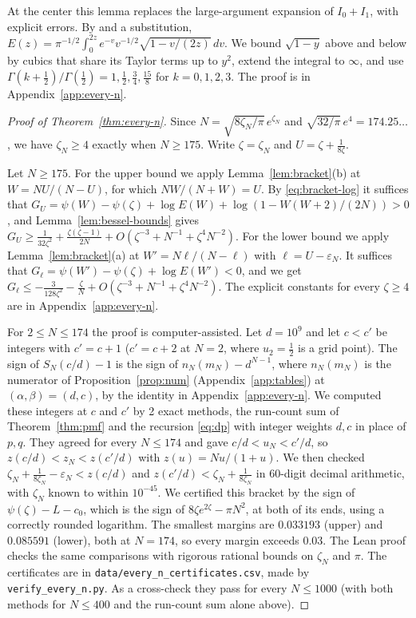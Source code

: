 At the center this lemma replaces the large-argument expansion of $I_0+I_1$, with explicit
errors. By \cite[Eq.~10.32.3]{dlmf} and a substitution,
$E(z)=\pi^{-1/2}\int_0^{2z}e^{-v}v^{-1/2}\sqrt{1-v/(2z)}\,dv$. We bound $\sqrt{1-y}$ above and below
by cubics that share its Taylor terms up to $y^2$, extend the integral to $\infty$, and use
$\Gamma(k+\frac12)/\Gamma(\frac12)=1,\frac12,\frac34,\frac{15}8$ for $k=0,1,2,3$. The proof is in
Appendix~\ref{app:every-n}.

\begin{proof}[Proof of Theorem~\ref{thm:every-n}]
Since $N=\sqrt{8\zeta_N/\pi}\,e^{\zeta_N}$ and $\sqrt{32/\pi}\,e^4=174.25\ldots$, we have
$\zeta_N\ge4$ exactly when $N\ge175$. Write $\zeta=\zeta_N$ and $U=\zeta+\frac1{8\zeta}$.

Let $N\ge175$. For the upper bound we apply Lemma~\ref{lem:bracket}(b) at $W=NU/(N-U)$, for which
$NW/(N+W)=U$. By \eqref{eq:bracket-log} it suffices that
$G_U=\psi(W)-\psi(\zeta)+\log E(W)+\log(1-W(W+2)/(2N))>0$, and Lemma~\ref{lem:bessel-bounds} gives
$G_U\ge\frac1{32\zeta^2}+\frac{\zeta(\zeta-1)}{2N}+O(\zeta^{-3}+N^{-1}+\zeta^4N^{-2})$. For the lower
bound we apply Lemma~\ref{lem:bracket}(a) at $W'=N\ell/(N-\ell)$ with $\ell=U-\varepsilon_N$. It
suffices that $G_\ell=\psi(W')-\psi(\zeta)+\log E(W')<0$, and we get
$G_\ell\le-\frac3{128\zeta^2}-\frac\zeta N+O(\zeta^{-3}+N^{-1}+\zeta^4N^{-2})$. The explicit constants for every $\zeta\ge4$ are in
Appendix~\ref{app:every-n}.

For $2\le N\le174$ the proof is computer-assisted. Let $d=10^9$ and let $c<c'$ be integers with
$c'=c+1$ ($c'=c+2$ at $N=2$, where $u_2=\frac12$ is a grid point). The sign of $S_N(c/d)-1$ is the
sign of $n_N(m_N)-d^{N-1}$, where $n_N(m_N)$ is the numerator of Proposition~\ref{prop:num}
(Appendix~\ref{app:tables}) at $(\alpha,\beta)=(d,c)$, by the identity in Appendix~\ref{app:every-n}.
We computed these integers at $c$ and $c'$ by 2 exact methods, the run-count sum of
Theorem~\ref{thm:pmf} and the recursion \eqref{eq:dp} with integer weights $d,c$ in place of $p,q$.
They agreed for every $N\le174$ and gave $c/d<u_N<c'/d$, so $z(c/d)<z_N<z(c'/d)$ with
$z(u)=Nu/(1+u)$. We then checked
$\zeta_N+\frac1{8\zeta_N}-\varepsilon_N<z(c/d)$ and $z(c'/d)<\zeta_N+\frac1{8\zeta_N}$ in 60-digit
decimal arithmetic, with $\zeta_N$ known to within $10^{-45}$. We certified this bracket by the
sign of $\psi(\zeta)-L-c_0$, which is the sign of $8\zeta e^{2\zeta}-\pi N^2$, at both of its ends,
using a correctly rounded logarithm. The smallest margins are $0.033193$ (upper) and $0.085591$
(lower), both at $N=174$, so every margin exceeds $0.03$. The Lean proof checks the same comparisons with
rigorous rational bounds on $\zeta_N$ and $\pi$. The certificates are in
\texttt{data/every\_n\_certificates.csv}, made by \texttt{verify\_every\_n.py}. As a cross-check they
pass for every $N\le1000$ (with both methods for $N\le400$ and the run-count sum alone above).
\end{proof}

